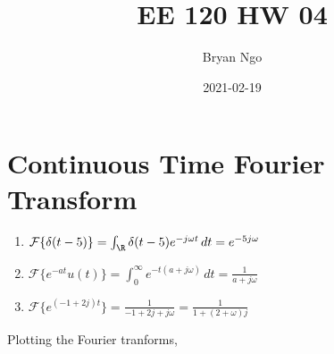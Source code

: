 \documentclass{article}
\title{EE 120 HW 04}
\author{Bryan Ngo}
\date{2021-02-19}
\newcommand{\F}{\mathcal{F}}
\begin{document}
\maketitle

\section{Continuous Time Fourier Transform}

\begin{enumerate}
    \item \(\F\{\delta(t - 5)\} = \int_{\R} \delta(t - 5) e^{-j \omega t} \, dt = e^{-5j \omega}\)
    \item \(\F\{e^{-at} u(t)\} = \int_0^\infty e^{-t (a + j \omega)} \, dt = \frac{1}{a + j \omega}\)
    \item \(\F\{e^{(-1 + 2j) t}\} = \frac{1}{-1 + 2j + j \omega} = \frac{1}{1 + (2 + \omega) j}\)
\end{enumerate}
Plotting the Fourier tranforms,
\end{document}
